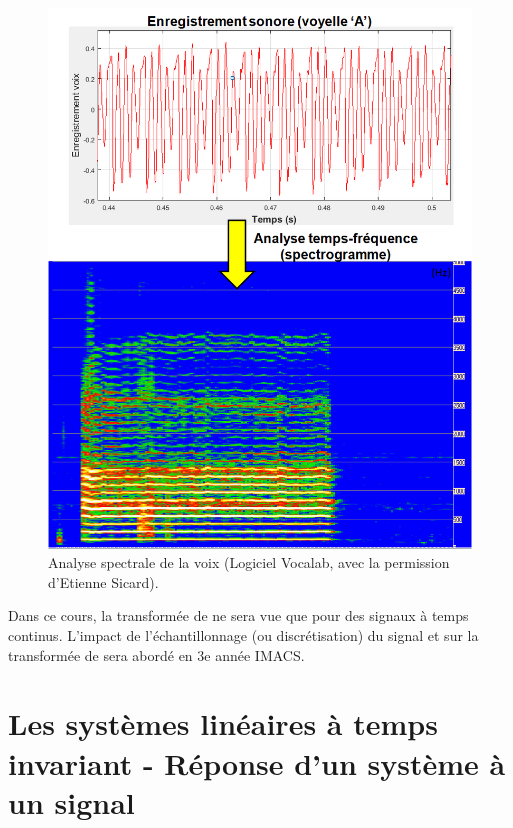 	\begin{figure}[h!]
		\centering
		\includegraphics[scale=0.5]{images/spectrogramme_voix.png} 
		\caption{Analyse spectrale de la voix (Logiciel Vocalab, avec la permission d'Etienne Sicard).}	
		\label{Fig:analyse_spectrale_voix}
	\end{figure}
	
	Dans ce cours, la transformée de \Fourier{} ne sera vue que pour des signaux à temps continus. L'impact de l'échantillonnage (ou discrétisation) du signal et sur la transformée de \Fourier{} sera abordé en 3e année IMACS.

	
	\section{Les systèmes linéaires à temps invariant - Réponse d'un système à un signal}
	
